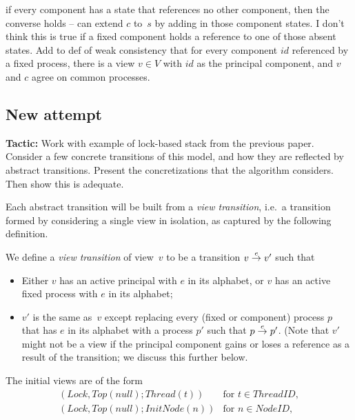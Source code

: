  if  every component has a state that references no other
component, then the converse holds -- can extend $c$ to~$s$ by adding in those
component states.  I don't think this is true if a fixed component holds a
reference to one of those absent states.  Add to def of weak consistency that
for every component $id$ referenced by a fixed process, there is a view $v \in
V$ with $id$ as the principal component, and $v$ and $c$ agree on common
processes.


\subsection{New attempt}

\textbf{Tactic:} Work with example of lock-based stack from the previous
paper.  Consider a few concrete transitions of this model, and how they are
reflected by abstract transitions.  Present the concretizations that the
algorithm considers.  Then show this is adequate.

Each abstract transition will be built from a \emph{view transition}, i.e.~a
transition formed by considering a single view in isolation, as captured by
the following definition.
%
\begin{definition}
We define a \emph{view transition} of view~$v$ to be a transition $v \stackrel{e}\rightarrow
v'$ such that
%
\begin{itemize}
\item Either $v$ has an active principal with $e$ in its alphabet, or $v$ has
  an active fixed process with $e$ in its alphabet;

\item $v'$ is the same as~$v$ except replacing every (fixed or component)
  process $p$ that has $e$ in its alphabet with a process $p'$ such that $p
  \stackrel{e}\rightarrow p'$.  (Note that $v'$ might not be a view if the principal
  component gains or loses a reference as a result of the transition; we
  discuss this further below.
\end{itemize}
\end{definition}

The initial views are of the form
\[
\begin{array}{ll}
(Lock, Top(null); Thread(t)) &  \mbox{for $t \in ThreadID$}, \\
(Lock, Top(null); InitNode(n)) & \mbox{for $n \in NodeID$},
\end{array}
\]

